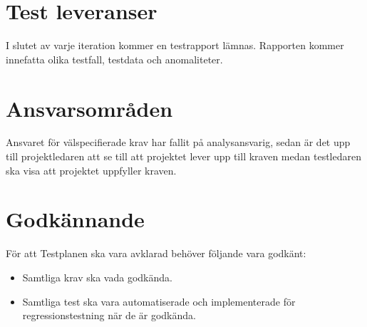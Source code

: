 \section{Test leveranser}
	I slutet av varje iteration kommer en testrapport lämnas. Rapporten kommer innefatta olika testfall, testdata och anomaliteter.




\section{Ansvarsområden}
	Ansvaret för välspecifierade krav har fallit på analysansvarig, sedan är det upp till projektledaren att se till att projektet lever upp till kraven medan testledaren ska visa att projektet uppfyller kraven.





\section{Godkännande}
	För att Testplanen ska vara avklarad behöver följande vara godkänt:
	\begin{itemize}
	 \item Samtliga krav ska vada godkända.
	\item Samtliga test ska vara automatiserade och implementerade för regressionstestning när de är godkända.

	\end{itemize}




\printbibliography



